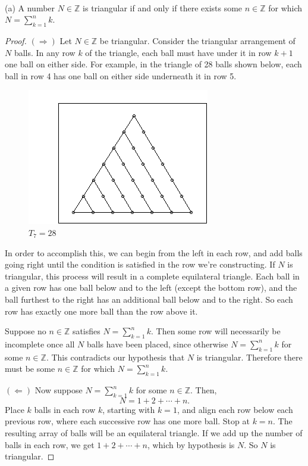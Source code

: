 \begin{problem}[3] \ \\
\noindent (a) A number $N \in \mathbb Z$ is triangular if and only if there exists some $n \in \mathbb Z$ for which $N = \sum_{k=1}^n k$. 
\begin{proof} $(\Longrightarrow)$ Let $N \in \mathbb Z$ be triangular. Consider the triangular arrangement of $N$ balls. In any row $k$ of the triangle, each ball must have under it in row $k+1$ one ball on either side. For example, in the triangle of 28 balls shown below, each ball in row 4 has one ball on either side underneath it in row 5.
\begin{figure}
\centering
\includegraphics[scale=0.5]{triangular}
\caption{$T_7 = 28$}
\end{figure}
In order to accomplish this, we can begin from the left in each row, and add balls going right until the condition is satisfied in the row we're constructing. If $N$ is triangular, this process will result in a complete equilateral triangle. Each ball in a given row has one ball below and to the left (except the bottom row), and the ball furthest to the right has an additional ball below and to the right. So each row has exactly one more ball than the row above it. 

Suppose no $n \in \mathbb Z$ satisfies $N = \sum_{k=1}^n k$. Then some row will necessarily be incomplete once all $N$ balls have been placed, since otherwise $N = \sum_{k=1}^n k$ for some $n \in \mathbb Z$. This contradicts our hypothesis that $N$ is triangular. Therefore there must be some $n \in \mathbb Z$ for which $N = \sum_{k=1}^n k$. 

$(\Longleftarrow)$ Now suppose $N = \sum_{k=1}^n k$ for some $n \in \mathbb Z$. Then, 
\[
N = 1 + 2 + \cdots + n.
\]
Place $k$ balls in each row $k$, starting with $k=1$, and align each row below each previous row, where each successive row has one more ball. Stop at $k=n$. The resulting array of balls will be an equilateral triangle. If we add up the number of balls in each row, we get $1 + 2 + \cdots + n$, which by hypothesis is $N$. So $N$ is triangular. 
\end{proof}


\end{problem}
